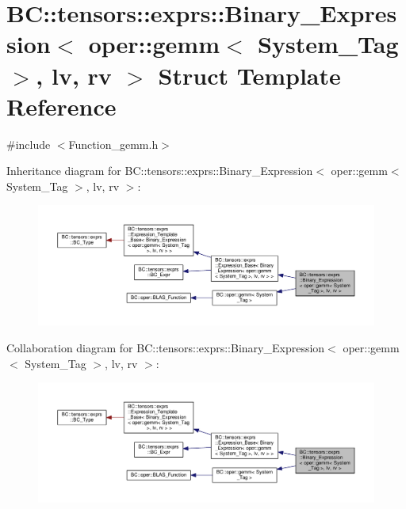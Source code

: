 \hypertarget{structBC_1_1tensors_1_1exprs_1_1Binary__Expression_3_01oper_1_1gemm_3_01System__Tag_01_4_00_01lv_00_01rv_01_4}{}\section{BC\+:\+:tensors\+:\+:exprs\+:\+:Binary\+\_\+\+Expression$<$ oper\+:\+:gemm$<$ System\+\_\+\+Tag $>$, lv, rv $>$ Struct Template Reference}
\label{structBC_1_1tensors_1_1exprs_1_1Binary__Expression_3_01oper_1_1gemm_3_01System__Tag_01_4_00_01lv_00_01rv_01_4}


{\ttfamily \#include $<$Function\+\_\+gemm.\+h$>$}



Inheritance diagram for BC\+:\+:tensors\+:\+:exprs\+:\+:Binary\+\_\+\+Expression$<$ oper\+:\+:gemm$<$ System\+\_\+\+Tag $>$, lv, rv $>$\+:
\nopagebreak
\begin{figure}[H]
\begin{center}
\leavevmode
\includegraphics[width=350pt]{structBC_1_1tensors_1_1exprs_1_1Binary__Expression_3_01oper_1_1gemm_3_01System__Tag_01_4_00_01lv_00_01rv_01_4__inherit__graph}
\end{center}
\end{figure}


Collaboration diagram for BC\+:\+:tensors\+:\+:exprs\+:\+:Binary\+\_\+\+Expression$<$ oper\+:\+:gemm$<$ System\+\_\+\+Tag $>$, lv, rv $>$\+:
\nopagebreak
\begin{figure}[H]
\begin{center}
\leavevmode
\includegraphics[width=350pt]{structBC_1_1tensors_1_1exprs_1_1Binary__Expression_3_01oper_1_1gemm_3_01System__Tag_01_4_00_01lv_00_01rv_01_4__coll__graph}
\end{center}
\end{figure}
